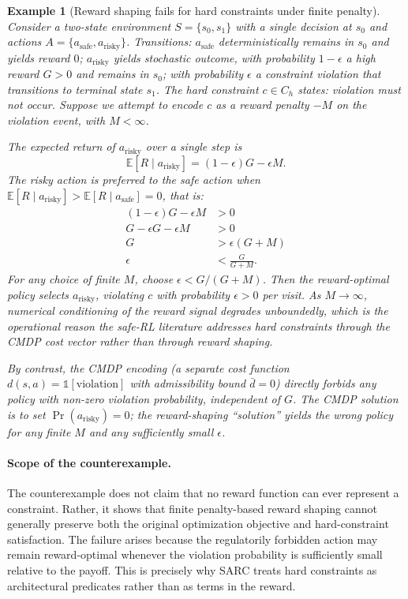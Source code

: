 \documentclass[11pt,a4paper]{article}
\newtheorem{example}{Example}
\theoremstyle{remark}
\begin{document}
\begin{example}[Reward shaping fails for hard constraints under finite penalty]\label{ex:counter}
Consider a two-state environment $S = \{s_0, s_1\}$ with a single decision at $s_0$ and actions $A = \{a_{\text{safe}}, a_{\text{risky}}\}$. Transitions: $a_{\text{safe}}$ deterministically remains in $s_0$ and yields reward $0$; $a_{\text{risky}}$ yields stochastic outcome, with probability $1{-}\epsilon$ a high reward $G > 0$ and remains in $s_0$; with probability $\epsilon$ a constraint violation that transitions to terminal state $s_1$. The hard constraint $c \in C_h$ states: \emph{violation must not occur}. Suppose we attempt to encode $c$ as a reward penalty $-M$ on the violation event, with $M < \infty$.

The expected return of $a_{\text{risky}}$ over a single step is
\[
    \mathbb{E}[R \mid a_{\text{risky}}] = (1-\epsilon) G - \epsilon M.
\]
The risky action is preferred to the safe action when $\mathbb{E}[R \mid a_{\text{risky}}] > \mathbb{E}[R \mid a_{\text{safe}}] = 0$, that is:
\begin{align*}
 (1-\epsilon) G - \epsilon M &> 0 \\
    G - \epsilon G - \epsilon M &> 0 \\
    G &> \epsilon (G + M) \\
    \epsilon &< \frac{G}{G + M}.
\end{align*}
For any choice of finite $M$, choose $\epsilon < G / (G + M)$. Then the reward-optimal policy selects $a_{\text{risky}}$, violating $c$ with probability $\epsilon > 0$ per visit. As $M \to \infty$, numerical conditioning of the reward signal degrades unboundedly, which is the operational reason the safe-RL literature \cite{altman1999cmdp,achiam2017cpo} addresses hard constraints through the CMDP cost vector rather than through reward shaping.

By contrast, the CMDP encoding (a separate cost function $d(s,a) = \mathbb{1}[\text{violation}]$ with admissibility bound $\bar d = 0$) directly forbids any policy with non-zero violation probability, independent of $G$. The CMDP solution is to set $\Pr(a_{\text{risky}}) = 0$; the reward-shaping ``solution'' yields the wrong policy for any finite $M$ and any sufficiently small $\epsilon$.
\end{example}

\paragraph{Scope of the counterexample.} The counterexample does not claim that no reward function can ever represent a constraint. Rather, it shows that finite penalty-based reward shaping cannot generally preserve both the original optimization objective and hard-constraint satisfaction. The failure arises because the regulatorily forbidden action may remain reward-optimal whenever the violation probability is sufficiently small relative to the payoff. This is precisely why SARC treats hard constraints as architectural predicates rather than as terms in the reward.
\end{document}
